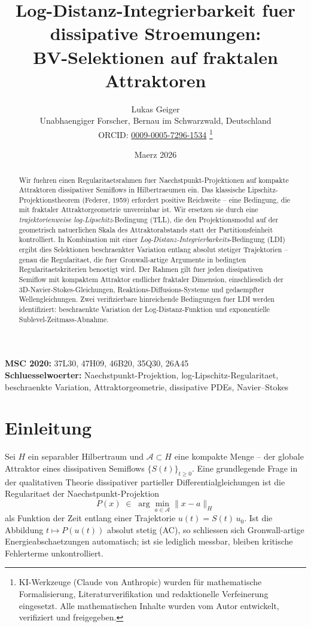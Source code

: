 \documentclass[12pt,a4paper]{article}
\title{\textbf{Log-Distanz-Integrierbarkeit fuer dissipative Stroemungen:\\
BV-Selektionen auf fraktalen Attraktoren}}
\author{Lukas Geiger\\
\small Unabhaengiger Forscher, Bernau im Schwarzwald, Deutschland\\
\small ORCID: \href{https://orcid.org/0009-0005-7296-1534}{0009-0005-7296-1534}%
\thanks{KI-Werkzeuge (Claude von Anthropic) wurden für mathematische Formalisierung, Literaturverifikation und redaktionelle Verfeinerung eingesetzt. Alle mathematischen Inhalte wurden vom Autor entwickelt, verifiziert und freigegeben.}}
\date{Maerz 2026}
\theoremstyle{definition}
\theoremstyle{plain}
\theoremstyle{remark}
\begin{document}
\maketitle

\begin{center}
\small
\textbf{MSC 2020:} 37L30, 47H09, 46B20, 35Q30, 26A45\\
\textbf{Schluesselwoerter:} Naechstpunkt-Projektion, log-Lipschitz-Regularitaet,
beschraenkte Variation, Attraktorgeometrie, dissipative PDEs, Navier--Stokes
\end{center}

\begin{abstract}
Wir fuehren einen Regularitaetsrahmen fuer Naechstpunkt-Projektionen
auf kompakte Attraktoren dissipativer Semiflows in Hilbertraeumen ein.
Das klassische Lipschitz-Projektionstheorem (Federer, 1959) erfordert
positive Reichweite -- eine Bedingung, die mit fraktaler
Attraktorgeometrie unvereinbar ist.  Wir ersetzen sie durch eine
\emph{trajektorienweise log-Lipschitz}-Bedingung (TLL), die den
Projektionsmodul auf der geometrisch natuerlichen Skala des
Attraktorabstands statt der Partitionsfeinheit kontrolliert.
In Kombination mit einer \emph{Log-Distanz-Integrierbarkeits}-Bedingung
(LDI) ergibt dies Selektionen beschraenkter Variation entlang absolut
stetiger Trajektorien -- genau die Regularitaet, die fuer
Gronwall-artige Argumente in bedingten Regularitaetskriterien
benoetigt wird.  Der Rahmen gilt fuer jeden dissipativen Semiflow
mit kompaktem Attraktor endlicher fraktaler Dimension, einschliesslich
der 3D-Navier-Stokes-Gleichungen, Reaktions-Diffusions-Systeme und
gedaempfter Wellengleichungen.  Zwei verifizierbare hinreichende
Bedingungen fuer LDI werden identifiziert: beschraenkte Variation
der Log-Distanz-Funktion und exponentielle Sublevel-Zeitmass-Abnahme.
\end{abstract}


\section{Einleitung}

Sei $H$ ein separabler Hilbertraum und $\mathcal{A} \subset H$ eine
kompakte Menge -- der globale Attraktor eines dissipativen Semiflows
$\{S(t)\}_{t \ge 0}$.  Eine grundlegende Frage in der qualitativen
Theorie dissipativer partieller Differentialgleichungen ist die
Regularitaet der Naechstpunkt-Projektion
\[
  P(x) \;\in\; \arg\min_{a \in \mathcal{A}} \|x - a\|_H
\]
als Funktion der Zeit entlang einer Trajektorie $u(t) = S(t)\,u_0$.
Ist die Abbildung $t \mapsto P(u(t))$ absolut stetig (AC), so
schliessen sich Gronwall-artige Energieabschaetzungen automatisch;
ist sie lediglich messbar, bleiben kritische Fehlerterme
unkontrolliert.
\end{document}
